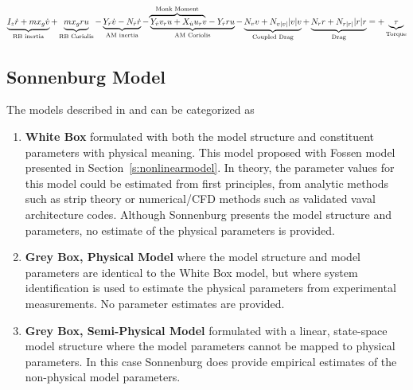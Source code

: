 \documentclass[11pt,draftcls,journal,onecolumn]{IEEEtran}
\begin{document}
\begin{equation}
\underbrace{I_z \dot{r} + m x_g \dot{v}}_\text{RB inertia}  
+ \underbrace{m x_g ru}_\text{RB Coriolis}
- \underbrace{Y_{\dot{r}}\dot{v} - N_{\dot{r}}\dot{r}}_\text{AM inertia}
- \lefteqn{\overbrace{\phantom{Y_{\dot{v}}v_r u + X_{\dot{u}}u_r v}}^\text{Monk Moment}}
\underbrace{Y_{\dot{v}}v_r u + X_{\dot{u}}u_r v - Y_{\dot{r}}ru}_\text{AM Coriolis}
- \underbrace{N_v v + N_{v|v|}|v|v}_\text{Coupled Drag} 
+ \underbrace{N_r r + N_{r|r|}|r|r}_\text{Drag} 
= 
+ \underbrace{\tau}_\text{Torque}
\label{e:fullr}
\end{equation}

\pagebreak
\subsection{Sonnenburg Model}

The models described in \cite{sonnenburg10control} and \cite{sonnenburg13modeling} can be categorized as 
\begin{enumerate}
\item {\bf White Box} formulated with both the model structure and constituent parameters with physical meaning.  This model proposed with Fossen model presented in Section~\ref{s:nonlinearmodel}.  In theory, the parameter values for this model could be estimated from first principles, from analytic methods such as strip theory or numerical/CFD methods such as validated vaval architecture codes.  Although Sonnenburg presents the model structure and parameters, no estimate of the physical parameters is provided. 
\item {\bf Grey Box, Physical Model} where the model structure and model parameters are identical to the White Box model, but where system identification is used to estimate the physical parameters from experimental measurements.   No parameter estimates are provided.
\item {\bf Grey Box, Semi-Physical Model} formulated with a linear, state-space model structure where the model parameters cannot be mapped to physical parameters.  In this case Sonnenburg does provide empirical estimates of the non-physical model parameters.
\end{enumerate}
\cite{sjoberg95nonlinear,nugroho18comparison}
\end{document}
